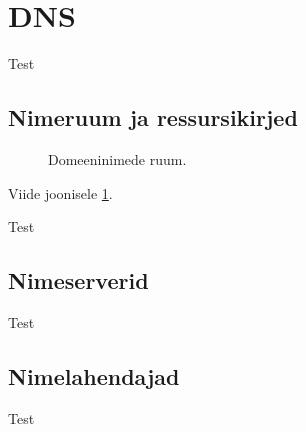 \documentclass[../main.tex]{subfiles}
\begin{document}
\newpage
\section{DNS}

Test

\subsection{Nimeruum ja ressursikirjed}

\begin{figure}[ht]
  \caption{Domeeninimede ruum.}
  \label{fig:domain-name-space}
\end{figure}

Viide joonisele \ref{fig:domain-name-space}.

Test

\subsection{Nimeserverid}

Test

\subsection{Nimelahendajad}

Test
\end{document}
